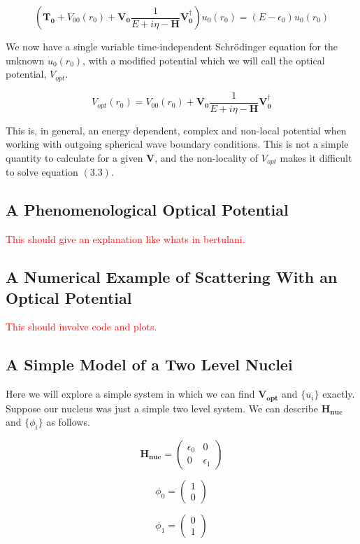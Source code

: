 \documentclass[12pt,letterpaper]{article}
\numberwithin{equation}{section}
\newcommand{\beq}{\begin{equation}}
\newcommand{\eeq}{\end{equation}}
\begin{document}
\beq
(\boldsymbol{T_0} + V_{00}(r_0) + \boldsymbol{V_0} \frac{1}{E + i\eta - \boldsymbol{H}} \boldsymbol{V_0^\dagger})u_0(r_0) = (E - \epsilon_0)u_0(r_0)
\eeq

We now have a single variable time-independent Schrödinger equation for the unknown $u_0(r_0)$, with a modified potential which we will call the optical potential, $V_{opt}$.

\beq
V_{opt}(r_0) = V_{00}(r_0) + \boldsymbol{V_0} \frac{1}{E + i\eta - \boldsymbol{H}} \boldsymbol{V_0^\dagger}
\eeq

This is, in general, an energy dependent, complex and non-local potential when working with outgoing spherical wave boundary conditions. This is not a simple quantity to calculate for a given $\boldsymbol{V}$, and the non-locality of $V_{opt}$ makes it difficult to solve equation $(3.3)$. 

\subsection{A Phenomenological Optical Potential}
\textcolor{red}{This should give an explanation like whats in bertulani.}

\subsection{A Numerical Example of Scattering With an Optical Potential}
\textcolor{red}{This should involve code and plots.}

\subsection{A Simple Model of a Two Level Nuclei}
Here we will explore a simple system in which we can find $\boldsymbol{V_{opt}}$ and $\{u_i\}$ exactly. Suppose our nucleus was just a simple two level system. We can describe $\boldsymbol{H_{nuc}}$ and $\{\phi_i\}$ as follows.

\beq
\boldsymbol{H_{nuc}} = 
\begin{pmatrix}
\epsilon_0 & 0 \\ 
0 & \epsilon_1
\end{pmatrix}
\eeq

\beq
\phi_0 = 
\begin{pmatrix}
1 \\ 0
\end{pmatrix}
\eeq

\beq
\phi_1 = 
\begin{pmatrix}
0 \\ 1
\end{pmatrix}
\eeq
\end{document}
